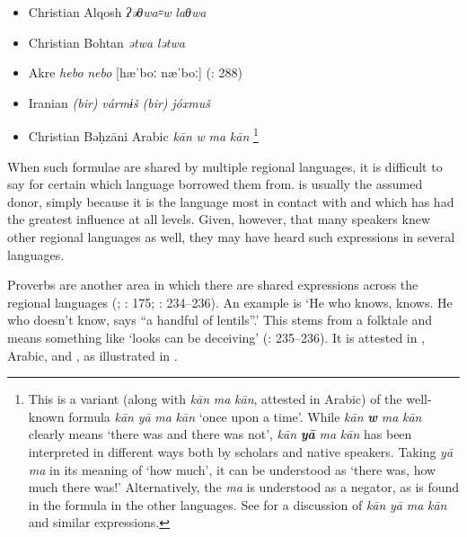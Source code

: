 \documentclass[output=paper]{langsci/langscibook}
\begin{document}
\begin{itemize}[noitemsep]

\item[] Christian Alqosh    \textit{ʔəθwa꞊w} \textit{laθwa} \citep[268]{Coghill2009}

\item[] Christian Bohtan    \textit{ətwa} \textit{lətwa} \citep{Fox2009}

\item[] Akre    \textit{hebo} \textit{nebo} [hæˈboː næˈboː] (\citealt{MacKenzie1962}: 288) 

\item[] Iranian    \textit{(bir)} \textit{vármɨš} \textit{(bir)} \textit{jóxmuš} \citep[175]{Garbell1965}

\item[] {Christian Bəḥzāni Arabic}   \textit{kān} \textit{w} \textit{ma} \textit{kān} \citep[404]{Jastrow1981}\footnote{This is a variant (along with \textit{kān} \textit{ma} \textit{kān}, attested in  Arabic) of the well-known formula \textit{kān} \textit{yā} \textit{ma} \textit{kān} ‘once upon a time’. While \textit{kān} \textbf{\textit{w}} \textit{ma} \textit{kān} clearly means ‘there was and there was not’, \textit{kān} \textbf{\textit{yā}} \textit{ma} \textit{kān} has been interpreted in different ways both by scholars and native speakers. Taking \textit{yā} \textit{ma} in its meaning of ‘how much’, it can be understood as ‘there was, how much there was!’ Alternatively, the \textit{ma} is understood as a negator, as is found in the formula in the other languages. See \citet{Lentin1995} for a discussion of \textit{kān} \textit{yā} \textit{ma} \textit{kān} and similar expressions.}
\end{itemize}

When such formulae are shared by multiple regional languages, it is difficult to say for certain which language  borrowed them from.  is usually the assumed donor, simply because it is the language most in contact with  and which has had the greatest influence at all levels. Given, however, that many speakers knew other regional languages as well, they may have heard such expressions in several languages.

Proverbs are another area in which there are shared expressions across the regional languages (\citealt{Segal1955}; \citealt{Garbell1965}: 175; \citealt{Chyet1995}: 234–236). An example is ‘He who knows, knows. He who doesn’t know, says “a handful of lentils”.’ This stems from a folktale and means something like ‘looks can be deceiving’ (\citealt{Chyet1995}: 235–236). It is attested in ,  Arabic, and , as illustrated in .
\end{document}
